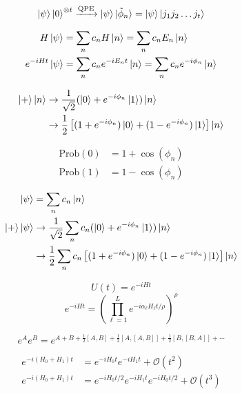 \documentclass[11pt, oneside]{article}   	%
\begin{document}
\begin{align*} 
\ket{\psi} \ket{0}^{\otimes t} \xrightarrow{\textrm{QPE}} \ket{\psi} \ket{\tilde{\phi}_n} = \ket{\psi} \ket{j_1 j_2 \dots j_t}
\end{align*}


\begin{align*} 
H \ket{\psi} & = \sum_n c_n H \ket{n} = \sum_n c_n E_n  \ket{n} \\
e^{-i H t} \ket{\psi} &= \sum_n c_n e^{-i E_n t} \ket{n} = \sum_n c_n e^{-i \phi_n} \ket{n}
\end{align*}

\begin{align*} 
\ket{+} \ket{n} 
& \rightarrow \frac{1}{\sqrt{2}} (\ket{0} + e^{-i \phi_n} \ket{1}) \ket{n} \\
& \rightarrow \frac{1}{2} \left[ (1+e^{-i \phi_n}) \ket{0} + (1-e^{-i \phi_n}) \ket{1} \right] \ket{n} 
\end{align*}

\begin{align*} 
\textrm{Prob}(0) &= 1 + \cos(\phi_n) \\
\textrm{Prob}(1) &= 1 - \cos(\phi_n)
\end{align*}

\begin{align*} 
\ket{\psi} &= \sum_n c_n \ket{n} \\
\ket{+} \ket{\psi} 
& \rightarrow \frac{1}{\sqrt{2}} \sum_n c_n (\ket{0} + e^{-i \phi_n} \ket{1}) \ket{n} \\
& \rightarrow \frac{1}{2} \sum_n c_n \left[ (1+e^{-i \phi_n}) \ket{0} + (1-e^{-i \phi_n}) \ket{1} \right] \ket{n} 
\end{align*}


\begin{equation*}
U(t) = e^{-iHt}
\end{equation*}
\begin{equation*}
e^{-iHt} = \left( \prod^L_{\ell=1} e^{-i \alpha_{\ell} H_{\ell} t/\rho} \right)^{\rho}
\end{equation*}

\begin{equation*}
e^{A} e^{B} = e^{A + B + \frac{1}{2} [A, B] + \frac{1}{2} [A, [A, B]] + \frac{1}{2} [B, [B, A]] + \cdots}
\end{equation*}

\begin{align*}
e^{-i (H_0 + H_1) t} &= e^{-i H_0 t} e^{-i H_1 t} + \mathcal{O}(t^2) \\
e^{-i (H_0 + H_1) t} &= e^{-i H_0 t/2} e^{-i H_1 t} e^{-i H_0 t/2} + \mathcal{O}(t^3)
\end{align*}
\end{document}
